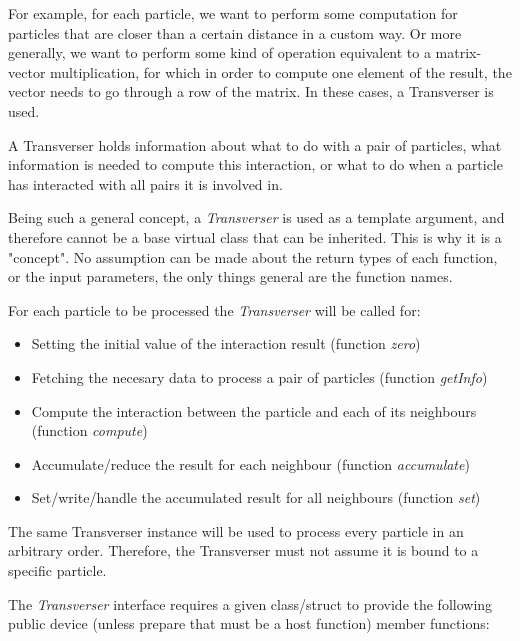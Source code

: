 \documentclass[ twoside,openright,titlepage,numbers=noenddot,%
headinclude,footinclude,cleardoublepage=empty,abstract=on,
BCOR=5mm,paper=a4,fontsize=11pt, dvipsnames
]{scrreprt}
\begin{document}
For example, for each particle, we want to perform some computation for particles that are closer than a certain distance in a custom way. Or more generally, we want to perform some kind of operation equivalent to a matrix-vector multiplication, for which in order to compute one element of the result, the vector needs to go through a row of the matrix.
In these cases, a Transverser is used.

A Transverser holds information about what to do with a pair of particles, what information is needed to compute this interaction, or what to do when a particle has interacted with all pairs it is involved in.  

Being such a general concept, a \emph{Transverser} is used as a template argument, and therefore cannot be a base virtual class that can be inherited. This is why it is a "concept". No assumption can be made about the return types of each function, or the input parameters, the only things general are the function names.  

For each particle to be processed the \emph{Transverser} will be called for: 
\begin{itemize}
\item Setting the initial value of the interaction result (function \emph{zero})
\item Fetching the necesary data to process a pair of particles  (function \emph{getInfo})
\item Compute the interaction between the particle  and each of its neighbours (function \emph{compute})
\item Accumulate/reduce  the result for each neighbour (function \emph{accumulate})
\item  Set/write/handle the accumulated result for all neighbours (function \emph{set})
 \end{itemize}
The same Transverser instance will be used to process every particle in an arbitrary order. Therefore, the Transverser must not assume it is bound to a specific particle.

The \emph{Transverser} interface requires a given class/struct to provide the following public device (unless prepare that must be a host function) member functions:
\end{document}
